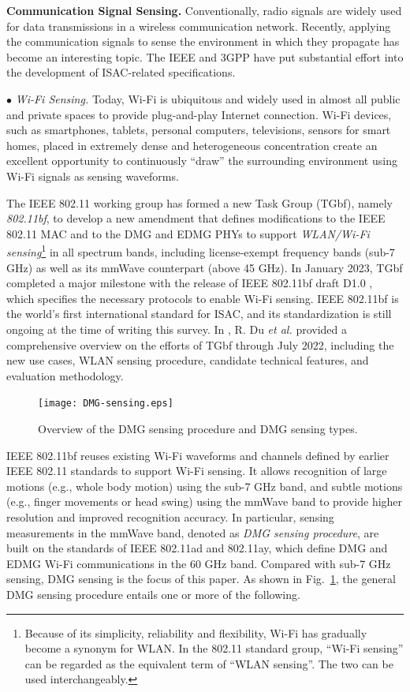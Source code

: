 \documentclass[journal,comsoc]{IEEEtran}
\begin{document}
{\bf{Communication Signal Sensing.}} Conventionally, radio signals are widely used for data transmissions in a wireless communication network. Recently, applying the communication signals to sense the environment in which they propagate has become an interesting topic. The IEEE and 3GPP have put substantial effort into the development of ISAC-related specifications.



$\bullet$ \emph{Wi-Fi Sensing.} Today, Wi-Fi is ubiquitous and widely used in almost all public and private spaces to provide plug-and-play Internet connection. Wi-Fi devices, such as smartphones, tablets, personal computers, televisions, sensors for smart homes, placed in extremely dense and heterogeneous concentration create an excellent opportunity to continuously ``draw'' the surrounding environment using Wi-Fi signals as sensing waveforms.


The IEEE 802.11 working group has formed a new Task Group (TGbf), namely \emph{802.11bf}, to develop a new amendment that defines modifications to the IEEE 802.11 MAC and to the DMG and EDMG PHYs to support \emph{WLAN/Wi-Fi sensing}\footnote{Because of its simplicity, reliability and flexibility, Wi-Fi has gradually become a synonym for WLAN. In the 802.11 standard group, ``Wi-Fi sensing'' can be regarded as the equivalent term of ``WLAN sensing''. The two can be used interchangeably.} in all spectrum bands, including license-exempt frequency bands (sub-7 GHz) as well as its mmWave counterpart (above 45 GHz). In January 2023, TGbf completed a major milestone with the release of IEEE 802.11bf draft D1.0 \cite{IEEE-Std-802.11bf}, which specifies the necessary protocols to enable Wi-Fi sensing. IEEE 802.11bf is the world's first international standard for ISAC, and its standardization is still ongoing at the time of writing this survey. In \cite{An-Overview-80211bf-sensing-2022}, R. Du \emph{et al.} provided a comprehensive overview on the efforts of TGbf through July 2022, including the new use cases, WLAN sensing procedure, candidate technical features, and evaluation methodology.


\begin{figure}[t]
	\centering
	\texttt{[image: DMG-sensing.eps]}
	\caption{Overview of the DMG sensing procedure and DMG sensing types.}
	\label{fig:DMG-sensing}
\end{figure}


IEEE 802.11bf reuses existing Wi-Fi waveforms and channels defined by earlier IEEE 802.11 standards to support Wi-Fi sensing. It allows recognition of large motions (e.g., whole body motion) using the sub-7 GHz band, and subtle motions (e.g., finger movements or head swing) using the mmWave band to provide higher resolution and improved recognition accuracy. In particular, sensing measurements in the mmWave band, denoted as \emph{DMG sensing procedure}, are built on the standards of IEEE 802.11ad and 802.11ay, which define DMG and EDMG Wi-Fi communications in the 60 GHz band. Compared with sub-7 GHz sensing, DMG sensing is the focus of this paper. As shown in Fig.~\ref{fig:DMG-sensing}, the general DMG sensing procedure entails one or more of the following.
\end{document}
